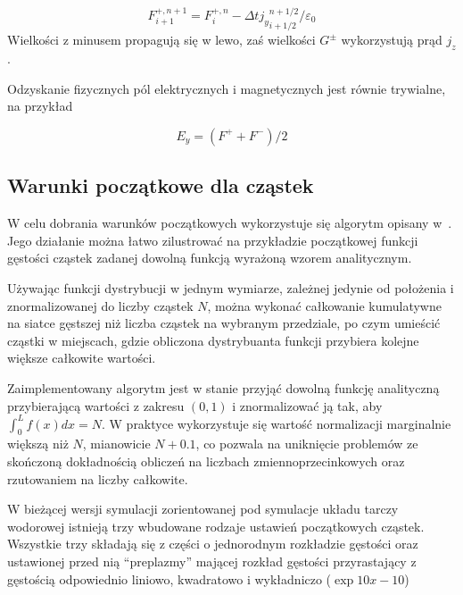 \begin{equation}
    {F}^{+,n+1}_{i+1} = F^{+,n}_i - \Delta t {j_y}_{i+1/2}^{n+1/2} / \varepsilon_0
\end{equation}
Wielkości z minusem propagują się w lewo, zaś wielkości $G^\pm$ wykorzystują prąd $j_z$.


Odzyskanie fizycznych pól elektrycznych i magnetycznych jest równie trywialne, na przykład 

\begin{equation}
E_y = \left( F^+ + F^- \right)/2
\end{equation}


\subsection{Warunki początkowe dla cząstek}

W celu dobrania warunków początkowych wykorzystuje się algorytm opisany w~\cite{birdsall}.
Jego działanie można łatwo zilustrować na
przykładzie początkowej funkcji gęstości cząstek zadanej dowolną funkcją
wyrażoną wzorem analitycznym.

Używając funkcji dystrybucji w jednym wymiarze, zależnej jedynie od
położenia i znormalizowanej do liczby cząstek $N$, można wykonać całkowanie
kumulatywne na siatce gęstszej niż liczba cząstek na wybranym przedziale,
po czym umieścić cząstki w miejscach, gdzie obliczona dystrybuanta funkcji
 przybiera kolejne większe całkowite wartości.


Zaimplementowany algorytm jest w stanie przyjąć dowolną funkcję analityczną
przybierającą  wartości z zakresu $(0, 1)$
i znormalizować ją tak, aby $\int_0^L
f(x) dx = N$. W praktyce wykorzystuje się wartość normalizacji marginalnie
większą niż $N$, mianowicie $N+0.1$, co pozwala na uniknięcie problemów ze
skończoną dokładnością obliczeń na liczbach zmiennoprzecinkowych oraz
rzutowaniem na liczby całkowite.

W bieżącej wersji symulacji zorientowanej pod symulacje układu tarczy
wodorowej istnieją trzy wbudowane rodzaje ustawień początkowych cząstek.
Wszystkie trzy składają się z części o jednorodnym rozkładzie gęstości oraz
ustawionej przed nią ``preplazmy'' mającej rozkład gęstości przyrastający z
gęstością odpowiednio liniowo, kwadratowo i wykładniczo ($\exp{10 x - 10}$)


